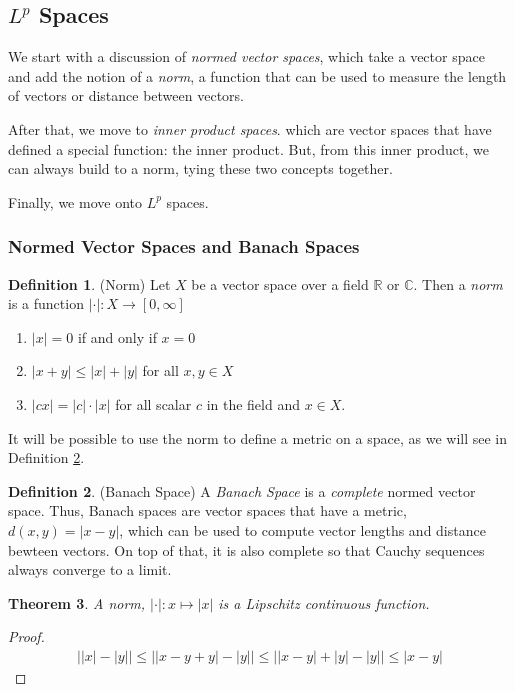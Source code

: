 \documentclass[12pt]{article}
\theoremstyle{plain}
\newtheorem{thm}{Theorem}[section]
\theoremstyle{definition}
\newtheorem{defn}[thm]{Definition}
\theoremstyle{remark}
\begin{document}
\subsection{$L^p$ Spaces}

We start with a discussion of \emph{normed vector spaces}, which take a
vector space and add the notion of a \emph{norm}, a function that can be
used to measure the length of vectors or distance between vectors.

After that, we move to \emph{inner product spaces}. which are vector
spaces that have defined a special function: the inner product. But,
from this inner product, we can always build to a norm, tying these two
concepts together.

Finally, we move onto $L^p$ spaces.

\subsubsection{Normed Vector Spaces and Banach Spaces}


\begin{defn}(Norm)
\label{defn.norm}
Let $X$ be a vector space over a field $\mathbb{R}$ or $\mathbb{C}$.
Then a \emph{norm} is a function
$\lvert\cdot\rvert:X\rightarrow[0,\infty]$
\begin{enumerate}
\item $\lvert x\rvert=0$ if and only if $x=0$
\item $\lvert x + y\rvert\leq \lvert x\rvert+\lvert y\rvert$ for all $x,y\in X$
\item $\lvert cx\rvert= |c|\cdot\lvert x\rvert$ for all scalar $c$ in the field and $x\in X$.
\end{enumerate}
It will be possible to use the norm to define a metric on a space, as we
will see in Definition \ref{defn.banach}.
\end{defn}

\begin{defn}(Banach Space)
\label{defn.banach}
A \emph{Banach Space} is a \emph{complete} normed vector space. Thus,
Banach spaces are vector spaces that have a metric, $d(x,y)=\lvert
x-y\rvert$, which can be used to compute vector lengths and distance
bewteen vectors. On top of that, it is also complete so that Cauchy
sequences always converge to a limit.
\end{defn}

\begin{thm}
A norm, $\lvert\cdot\rvert: x\mapsto \rvert x \lvert$ is a Lipschitz
continuous function.
\end{thm}
\begin{proof}
\begin{align*}
    \bigl\lvert \lvert x \rvert - \lvert y\rvert \bigr\rvert
    \leq
    \bigl\lvert \lvert x - y + y\rvert - \lvert y\rvert \bigr\rvert
    \leq
    \bigl\lvert \lvert x - y \rvert + \lvert y\rvert - \lvert y\rvert \bigr\rvert
    \leq
    \lvert x - y \rvert
\end{align*}
\end{proof}
\end{document}
